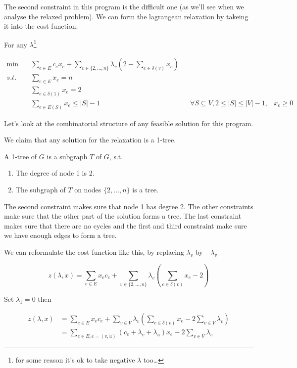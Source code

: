 The second constraint in this program is the difficult one (as we'll see when we analyse the relaxed problem). We can form the lagrangean relaxation by takeing it into the cost function.

For any $\lambda$\footnote{for some reason it's ok to take negative $\lambda$ too\ldots}

\begin{align*}
\min \quad & \sum_{e\in E} c_e x_e + \sum_{v\in \{2,\ldots,n\}} \lambda_v(2-\sum_{e\in \delta(v)} x_e)\\
s.t. \quad & \sum_{e\in E} x_e = n\\
	&\sum_{e\in \delta(1)} x_e=2\\
	&\sum_{e\in E(S)} x_e \leq |S|-1 && \forall S \subseteq V, 2\leq |S|\leq |V|-1,
	& x_{e} \geq  0
\end{align*}

Let's look at the combinatorial structure of any feasible solution for this program.

We claim that any solution for the relaxation is a 1-tree.

\begin{Def} A 1-tree of $G$ is a subgraph $T$ of $G$, s.t.
\begin{enumerate}
\item The degree of node 1 is 2.
\item The subgraph of $T$ on nodes $\{2,\ldots,n\}$ is a tree.
\end{enumerate}
\end{Def}

The second constraint makes sure that node 1 has degree 2. The other constraints make sure that the other part of the solution forms a tree. The last constraint makes sure that there are no cycles and the first and third constraint make sure we have enough edges to form a tree.

We can reformulate the cost function like this, by replacing $\lambda_v$ by $-\lambda_v$

\[z(\lambda,x) = \sum_{e\in E} x_ec_e + \sum_{v\in \{2,\ldots,n\}} \lambda_v (\sum_{e\in \delta(v)} x_e-2)\]

Set $\lambda_1=0$ then

\begin{align*}
z(\lambda,x) &= \sum_{e\in E} x_ec_e + \sum_{v\in V} \lambda_v (\sum_{e\in \delta(v)} x_e-2\sum_{v\in V} \lambda_v)\\
	&=\sum_{e\in E, e=(v,u)} (c_e + \lambda_v + \lambda_u)x_e - 2 \sum_{v\in V}\lambda_v
\end{align*}

